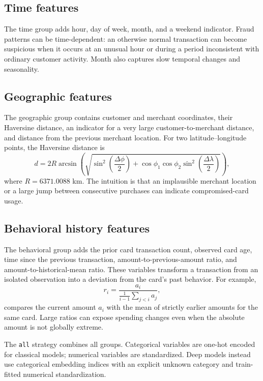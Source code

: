\documentclass[11pt,a4paper]{article}
\newcommand{\code}[1]{\texttt{#1}}
\begin{document}
\subsection{Time features}

The time group adds hour, day of week, month, and a weekend indicator. Fraud patterns can be time-dependent: an otherwise normal transaction can become suspicious when it occurs at an unusual hour or during a period inconsistent with ordinary customer activity. Month also captures slow temporal changes and seasonality.

\subsection{Geographic features}

The geographic group contains customer and merchant coordinates, their Haversine distance, an indicator for a very large customer-to-merchant distance, and distance from the previous merchant location. For two latitude--longitude points, the Haversine distance is
\begin{equation}
d=2R\arcsin\!\left(\sqrt{\sin^2\!\left(\frac{\Delta\phi}{2}\right)+
\cos\phi_1\cos\phi_2\sin^2\!\left(\frac{\Delta\lambda}{2}\right)}\right),
\end{equation}
where $R=6371.0088$ km. The intuition is that an implausible merchant location or a large jump between consecutive purchases can indicate compromised-card usage.

\subsection{Behavioral history features}

The behavioral group adds the prior card transaction count, observed card age, time since the previous transaction, amount-to-previous-amount ratio, and amount-to-historical-mean ratio. These variables transform a transaction from an isolated observation into a deviation from the card's past behavior. For example,
\begin{equation}
r_i=\frac{a_i}{\frac{1}{i-1}\sum_{j<i}a_j},
\end{equation}
compares the current amount $a_i$ with the mean of strictly earlier amounts for the same card. Large ratios can expose spending changes even when the absolute amount is not globally extreme.

The \code{all} strategy combines all groups. Categorical variables are one-hot encoded for classical models; numerical variables are standardized. Deep models instead use categorical embedding indices with an explicit unknown category and train-fitted numerical standardization.
\end{document}
